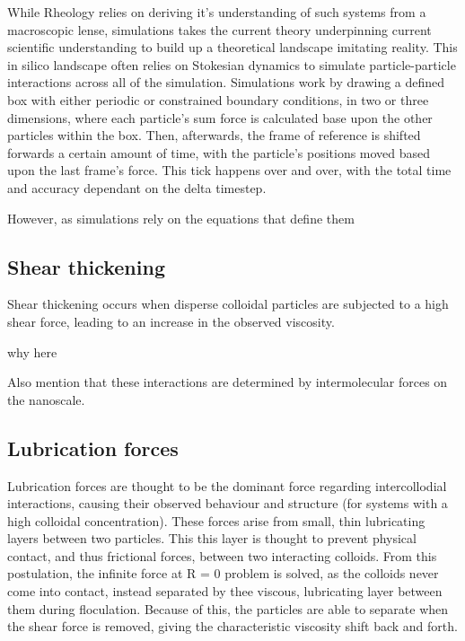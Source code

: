  While Rheology relies on deriving it's understanding of such systems from a macroscopic lense, simulations takes the current theory underpinning current scientific understanding to build up a theoretical landscape imitating reality. This in silico landscape often relies on Stokesian dynamics to simulate particle-particle interactions across all of the simulation. Simulations work by drawing a defined box with either periodic or constrained boundary conditions, in two or three dimensions, where each particle's sum force is calculated base upon the other particles within the box. Then, afterwards, the frame of reference is shifted forwards a certain amount of time, with the particle's positions moved based upon the last frame's force. This tick happens over and over, with the total time and accuracy dependant on the delta timestep.\cite{foss_brady_2000}
 
 
 
 However, as simulations rely on the equations that define them \cite{Rheo2}

\newpage

\subsection{Shear thickening}

Shear thickening occurs when disperse colloidal particles are subjected to a high shear force, leading to an increase in the observed viscosity.

why here

Also mention that these interactions are determined by intermolecular forces on the nanoscale.

\cite{SmartMats, Rheo2}

\subsection{Lubrication forces}

Lubrication forces are thought to be the dominant force regarding intercollodial interactions, causing their observed behaviour and structure (for systems with a high colloidal concentration). These forces arise from small, thin lubricating layers between two particles. This this layer is thought to prevent physical contact, and thus frictional forces, between two interacting colloids. From this postulation, the infinite force at R = 0 problem is solved, as the colloids never come into contact, instead separated by thee viscous, lubricating layer between them during floculation. Because of this, the particles are able to separate when the shear force is removed, giving the characteristic viscosity shift back and forth.

